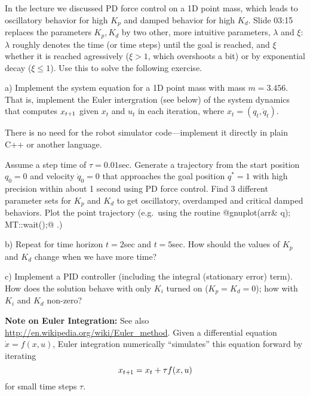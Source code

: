 

\renewcommand{\course}{Robotics}
\renewcommand{\coursepicture}{roboticsLecture}
\renewcommand{\coursedate}{Winter 2014}
\renewcommand{\exnum}{5}

\exercises

In the lecture we discussed PD force control on a 1D point mass,
which leads to oscillatory behavior for high $K_p$ and damped behavior
for high $K_d$. Slide 03:15 replaces the parameters
$K_p,K_d$ by two other, more intuitive parameters, $\lambda$ and
$\xi$: $\lambda$ roughly denotes the time (or time steps) until the
goal is reached, and $\xi$ whether it is reached agressively ($\xi>1$,
which overshoots a bit) or by exponential decay ($\xi\le 1$). Use this
to solve the following exercise.


a) Implement the system equation for a 1D point mass with mass
$m=3.456$. That is, implement the Euler intergration (see below) of
the system dynamics that computes $x_{t{{\hspace*{-.0pt}\text{\rm +}\hspace*{-.5pt}}1}}$ given $x_t$ and $u_t$ in
each iteration, where $x_t = (q_t,\dot q_t)$.

There is no need for the robot simulator code---implement it directly
in plain C++ or another language.

Assume a step time of $\tau=0.01$sec. Generate a trajectory from the
start position $q_0=0$ and velocity $\dot q_0=0$ that approaches the
goal position $q^*=1$ with high precision within about 1 second using
PD force control.  Find 3 different parameter sets for $K_p$ and $K_d$
to get oscillatory, overdamped and critical damped behaviors. Plot the
point trajectory (e.g.\ using the routine
%
@gnuplot(arr& q); MT::wait();@ .)

b) Repeat for time horizon $t=2$sec and $t=5$sec. How should the
values of $K_p$ and $K_d$ change when we have more time?

c) Implement a PID controller (including the integral (stationary error)
term). How does the solution behave with only $K_i$ turned on
($K_p=K_d=0$); how with $K_i$ and $K_d$ non-zero?

\textbf{Note on Euler Integration:} See
also \url{http://en.wikipedia.org/wiki/Euler_method}. Given a
differential equation $\dot x = f(x,u)$, Euler integration numerically
``simulates'' this equation forward by iterating
$$x_{t{{\hspace*{-.0pt}\text{\rm +}\hspace*{-.5pt}}1}} = x_t + \tau f(x,u)$$
for small time steps $\tau$.



